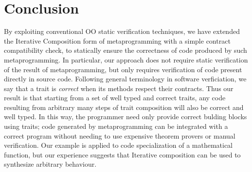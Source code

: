 \section{Conclusion}
By exploiting conventional OO static verification techniques, we have extended the Iterative Composition form of metaprogramming with a simple contract compatibility check, to statically ensure the correctness of code produced by such metaprogramming. In particular, our approach does not require static verification of the result of metaprogramming, but only requires verification of code present directly in source code.
Following general terminology in software verficiation, we say that a trait is \emph{correct} when its methods respect their contracts.
Thus our result is that starting from a set
of well typed and correct traits, 
any code resulting from arbitrary many steps of trait composition will also be correct and well typed.
In this way, the programmer need only provide correct bulding blocks using traits;
code generated by metaprogramming can be integrated with a correct program without needing to use expensive theorem provers or manual verification.
Our example is applied to code specialization of a mathematical function, but our experience suggests that Iterative composition can be used to synthesize arbitrary behaviour.
